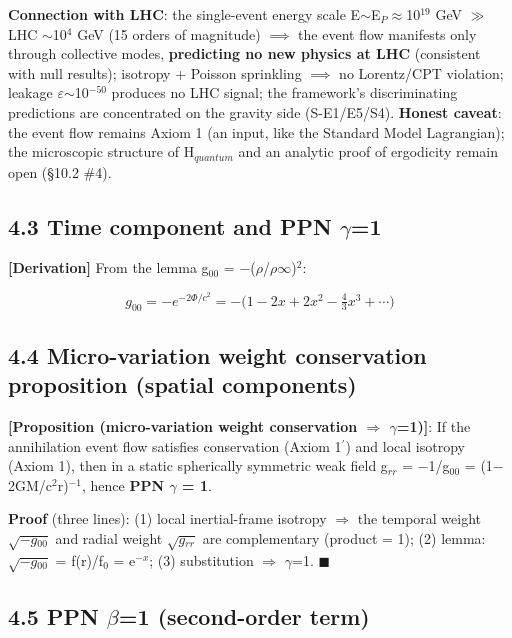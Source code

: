 \documentclass[12pt]{article}
\newcommand{\mtag}[1]{\textbf{[#1]}}
\newcommand{\up}[1]{\ensuremath{^{#1}}}
\newcommand{\down}[1]{\ensuremath{_{#1}}}
\begin{document}
\textbf{Connection with LHC}: the single-event energy scale E\ensuremath{\sim}E\down{P}\ensuremath{\approx}10\up{19} GeV \ensuremath{\gg} LHC \ensuremath{\sim}10\up{4} GeV (15 orders of magnitude) \ensuremath{\implies} the event flow manifests only through collective modes, \textbf{predicting no new physics at LHC} (consistent with null results); isotropy + Poisson sprinkling \ensuremath{\implies} no Lorentz/CPT violation; leakage \ensuremath{\varepsilon}\ensuremath{\sim}10\up{-50} produces no LHC signal; the framework's discriminating predictions are concentrated on the gravity side (S-E1/E5/S4). \textbf{Honest caveat}: the event flow remains Axiom 1 (an input, like the Standard Model Lagrangian); the microscopic structure of H\down{quantum} and an analytic proof of ergodicity remain open (\S{}10.2 \#4).

\subsection{4.3 Time component and PPN \ensuremath{\gamma}=1}

\mtag{Derivation} From the lemma g\down{00} = \ensuremath{-}(\ensuremath{\rho}/\ensuremath{\rho}\ensuremath{\infty})\up{2}:

\[g_{00} = -e^{-2\Phi/c^2} = -\big(1 - 2x + 2x^2 - \tfrac43 x^3 + \cdots\big)\]

\subsection{4.4 Micro-variation weight conservation proposition (spatial components)}

\textbf{\mtag{Proposition (micro-variation weight conservation \ensuremath{\Rightarrow} \ensuremath{\gamma}=1)}}: If the annihilation event flow satisfies conservation (Axiom 1\ensuremath{^\prime}) and local isotropy (Axiom 1), then in a static spherically symmetric weak field g\down{rr} = \ensuremath{-}1/g\down{00} = (1\ensuremath{-}2GM/c\up{2}r)\up{-1}, hence \textbf{PPN \ensuremath{\gamma} = 1}.

\textbf{Proof} (three lines): (1) local inertial-frame isotropy \ensuremath{\Rightarrow} the temporal weight \ensuremath{\sqrt{-g\down{00}}} and radial weight \ensuremath{\sqrt{g\down{rr}}} are complementary (product = 1); (2) lemma: \ensuremath{\sqrt{-g\down{00}}} = f(r)/f\down{0} = e\up{-x}; (3) substitution \ensuremath{\Rightarrow} \ensuremath{\gamma}=1. \ensuremath{\blacksquare}

\subsection{4.5 PPN \ensuremath{\beta}=1 (second-order term)}
\end{document}
